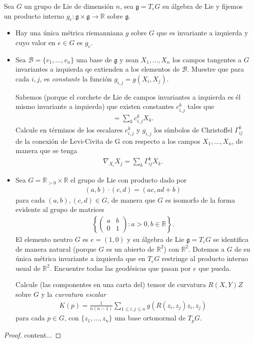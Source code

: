 \documentclass[11pt]{article}
\newcommand{\R}{\mathbb{R}}
\newcommand{\paint}[1]{\color{color}{#1}}
\newenvironment{exercise}[2][Ejercicio]{\begin{trivlist}
\item[\hskip \labelsep \paint{{\bfseries #1}}\hskip \labelsep {\bfseries #2.}]}{\end{trivlist}}
\begin{document}
\begin{exercise}{5} Sea $G$ un grupo de Lie de dimensión $n$, sea $\mathfrak{g} = T_eG$ su álgebra de Lie y fijemos un producto interno $g_e : \mathfrak{g} \times \mathfrak{g} \to \R$ sobre $\mathfrak{g}$.
\begin{itemize}
\item[(a)] Hay una única métrica riemanniana $g$ sobre $G$ que es invariante a izquierda y cuyo valor en $e \in G$ es $g_e$.
\item[(b)] Sea $\mathscr{B} = \{v_1, \dots, v_n\}$ una base de $\mathfrak{g}$ y sean $X_1, \dots, X_n$ los campos tangentes a $G$ invariantes a izquierda qe extienden a los elementos de $\mathscr{B}$. Muestre que para cada $i,j$, es \textit{constante} la función $g_{i,j} = g(X_i,X_j)$.

Sabemos (porque el corchete de Lie de campos invariantes a izquierda es él mismo invariante a izquierda) que existen constantes $c_{i,j}^k$ tales que
\begin{align*}
[X_i,X_j] = \sum_{k}c_{i,j}^kX_k.
\end{align*}
Calcule en términos de los escalares $c_{i,j}^k$ y $g_{i,j}$ los símbolos de Christoffel $\Gamma_{ij}^k$ de la conexión de Levi-Civita de G con respecto a los campos $X_1, \dots, X_n$, de manera que se tenga
\begin{align*}
\nabla_{X_i}X_j = \sum_k\Gamma_{ij}^kX_k.
\end{align*}
\item[(c)] Sea $G = \R_{>0 } \times \R$ el grupo de Lie con producto dado por
\begin{align*}
(a,b) \cdot (c,d) = (ac,ad+b)
\end{align*}
para cada $(a,b),(c,d) \in G$, de manera que $G$ es isomorfo de la forma evidente al grupo de matrices 
\begin{align*}
\left\{\begin{pmatrix}
a & b \\
0 & 1
\end{pmatrix} : a >0, b \in \R\right\}.
\end{align*}
El elemento neutro $G$ es $e = (1,0)$ y su álgebra de Lie $\mathfrak{g} = T_eG$ se identifica de manera natural (porque $G$ es un abierto de $\R^2$) con $\R^2$. Dotemos a $G$ de su única métrica invariante a izquierda que en $T_eG$ restringe al producto interno usual de $\R^2$. Encuentre todas las geodésicas que pasan por $e$ que pueda.

Calcule (las componentes en una carta del) tensor de curvatura $R(X,Y)Z$ sobre $G$ y la \textit{curvatura escalar}
\begin{align*}
K(p) = \frac{1}{n(n-1)} \sum_{1 \leq i,j \leq n}g(R(z_i,z_j)z_i,z_j)
\end{align*}
para cada $p \in G$, con $\{z_1, \dots, z_n\}$ una base ortonormal de $T_pG$.
\end{itemize}
\end{exercise}
\begin{proof}
content...
\end{proof}
\end{document}
